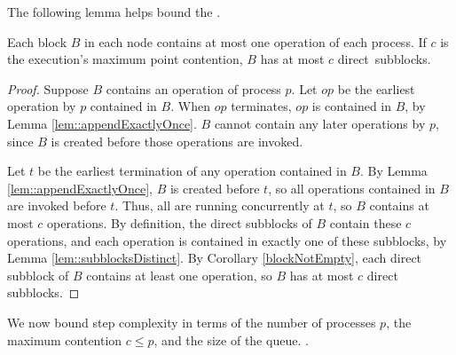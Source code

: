 The following lemma helps bound the .
\begin{lemma}\label{blockSize}
Each block $B$ in each node contains at most one operation of each process.
If $c$ is the execution's maximum point contention, $B$ has at most $c$ direct~subblocks.
\end{lemma}
\begin{proof}
Suppose $B$ contains an operation of process $p$.
Let $op$ be the earliest operation by $p$ contained in $B$.
When $op$ terminates, $op$ is contained in $B$, by Lemma \ref{lem::appendExactlyOnce}.
$B$ cannot contain any later operations by $p$, since $B$ is created before
those operations are invoked.

Let $t$ be the earliest termination of any operation contained in $B$.
By Lemma \ref{lem::appendExactlyOnce}, $B$ is created before $t$, so all operations contained in $B$
are invoked before $t$.  Thus, all are  running concurrently at $t$, so $B$ contains at most $c$ operations.
By definition, the direct subblocks of $B$ contain these $c$ operations, and each operation is contained
in exactly one of these subblocks, by Lemma \ref{lem::subblocksDistinct}.
By Corollary \ref{blockNotEmpty}, each direct subblock of $B$ contains at least one operation,
so $B$ has at most $c$ direct subblocks.
\end{proof}

We now bound step complexity in terms of the number of processes $p$, the maximum contention $c\leq p$, and the size of the queue.
. 

